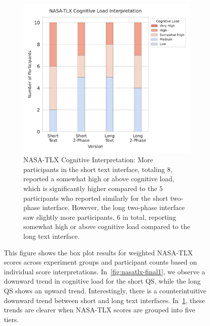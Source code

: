 \begin{figure}[!h]
    \hfill
    \begin{subfigure}[t]{0.49\textwidth}
        \centering
        \includegraphics[width=1\textwidth]{content/image/results/nasatlx_cog_value_interpreted.pdf}
        \caption{NASA-TLX Cognitive Interpretation: More participants in the short text interface, totaling $8$, reported a somewhat high or above cognitive load, which is significantly higher compared to the $5$ participants who reported similarly for the short two-phase interface. However, the long two-phase interface saw slightly more participants, $6$ in total, reporting somewhat high or above cognitive load compared to the long text interface.}
        \label{fig:nasatlx-final2}
    \end{subfigure}
    \caption{This figure shows the box plot results for weighted NASA-TLX scores across experiment groups and participant counts based on individual score interpretations. In~\ref{fig:nasatlx-final1}, we observe a downward trend in cognitive load for the short QS, while the long QS shows an upward trend. Interestingly, there is a counterintuitive downward trend between short and long text interfaces. In~\ref{fig:nasatlx-final2}, these trends are clearer when NASA-TLX scores are grouped into five tiers.}
    \label{fig:nasatlx-final}
\end{figure}

